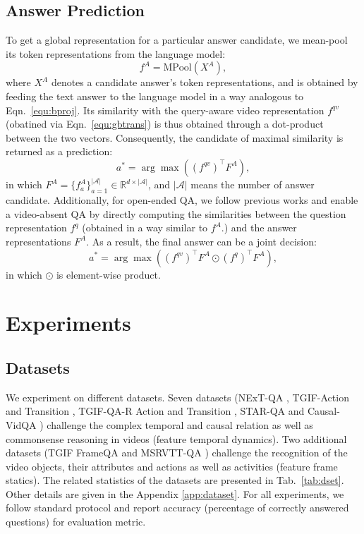 \documentclass[10pt,journal,compsoc]{IEEEtran}
\begin{document}
\subsection{Answer Prediction}
\label{sec:ad}
To get a global representation for a particular answer candidate, we mean-pool its token representations from the language model: 
\begin{equation}
\label{equ:mpool}
    f^A = \text{MPool}(X^A),
\end{equation}
where $X^A$ denotes a candidate answer's token representations, and is obtained by feeding the text answer to the language model in a way analogous to Eqn.~\eqref{equ:bproj}. Its similarity with the query-aware video representation $f^{qv}$ (obatined via Eqn.~\eqref{equ:gbtrans}) is thus obtained through a dot-product between the two vectors. Consequently, the candidate of maximal similarity is returned as a prediction:
\begin{equation}
    a^* = \arg \max((f^{qv})^\intercal F^A),
\end{equation}
in which $F^A=\{f^A_a\}_{a=1}^{|\mathcal{A}|}\in\mathbb{R}^{d \times |\mathcal{A}|}$, and $|\mathcal{A}|$ means the number of answer candidate.
Additionally, for open-ended QA, we follow previous works \cite{xiao2021video} and enable a video-absent QA by directly computing the similarities between the question representation $f^q$ (obtained in a way similar to $f^A$.) and the answer representations $F^A$. As a result, the final answer can be a joint decision: 
\begin{equation}
\label{equ:oe}
    a^* = \arg \max((f^{qv})^\intercal F^A \odot (f^q)^\intercal F^A),
\end{equation}
in which $\odot$ is element-wise product. 
 

\section{Experiments}
\label{sec:exp}

\subsection{Datasets}
We experiment on different datasets. Seven datasets (NExT-QA \cite{xiao2021next}, TGIF-Action and Transition \cite{jang2017tgif}, TGIF-QA-R Action and Transition \cite{peng2021progressive}, STAR-QA \cite{wu2021star} and Causal-VidQA \cite{li2022representation}) challenge the complex temporal and causal relation as well as commonsense reasoning in videos (feature temporal dynamics). Two additional datasets (TGIF FrameQA \cite{jang2017tgif} and MSRVTT-QA \cite{xu2017video}) challenge the recognition of the video objects, their attributes and actions as well as activities (feature frame statics).
The related statistics of the datasets are presented in Tab.~\ref{tab:dset}. Other details are given in the Appendix \ref{app:dataset}. For all experiments, we follow standard protocol and report accuracy (percentage of correctly answered questions) for evaluation metric.
\end{document}
